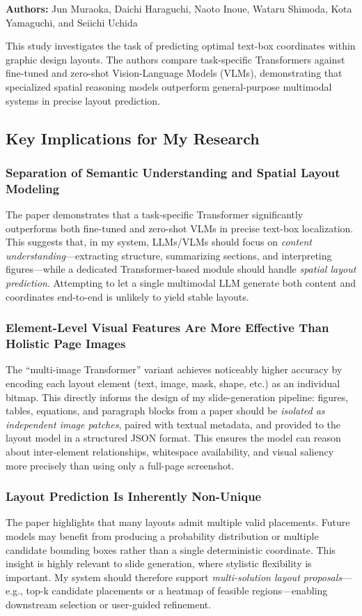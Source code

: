 \documentclass{article}
\begin{document}
\noindent \textbf{Authors:} Jun Muraoka, Daichi Haraguchi, Naoto Inoue, Wataru Shimoda, Kota Yamaguchi, and Seiichi Uchida

\noindent This study investigates the task of predicting optimal text-box coordinates within graphic design layouts. The authors compare task-specific Transformers against fine-tuned and zero-shot Vision-Language Models (VLMs), demonstrating that specialized spatial reasoning models outperform general-purpose multimodal systems in precise layout prediction.

\subsection{Key Implications for My Research}

\subsubsection{Separation of Semantic Understanding and Spatial Layout Modeling}
The paper demonstrates that a task-specific Transformer significantly outperforms both fine-tuned and zero-shot VLMs in precise text-box localization. This suggests that, in my system, LLMs/VLMs should focus on \textit{content understanding}—extracting structure, summarizing sections, and interpreting figures—while a dedicated Transformer-based module should handle \textit{spatial layout prediction}. Attempting to let a single multimodal LLM generate both content and coordinates end-to-end is unlikely to yield stable layouts.

\subsubsection{Element-Level Visual Features Are More Effective Than Holistic Page Images}
The ``multi-image Transformer'' variant achieves noticeably higher accuracy by encoding each layout element (text, image, mask, shape, etc.) as an individual bitmap. This directly informs the design of my slide-generation pipeline: figures, tables, equations, and paragraph blocks from a paper should be \textit{isolated as independent image patches}, paired with textual metadata, and provided to the layout model in a structured JSON format. This ensures the model can reason about inter-element relationships, whitespace availability, and visual saliency more precisely than using only a full-page screenshot.

\subsubsection{Layout Prediction Is Inherently Non-Unique}
The paper highlights that many layouts admit multiple valid placements. Future models may benefit from producing a probability distribution or multiple candidate bounding boxes rather than a single deterministic coordinate. This insight is highly relevant to slide generation, where stylistic flexibility is important. My system should therefore support \textit{multi-solution layout proposals}—e.g., top-k candidate placements or a heatmap of feasible regions—enabling downstream selection or user-guided refinement.
\end{document}
